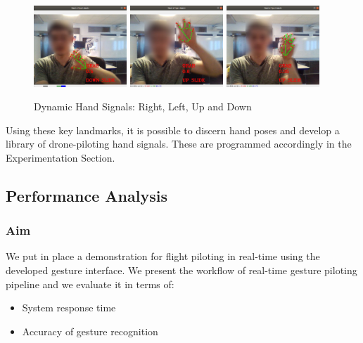 \begin{figure}[h]
    \raggedright
    \includegraphics[width=3.5cm]{images/hand_drone_interaction/grab_down_censored.jpg} %
    \includegraphics[width=3.5cm]{images/hand_drone_interaction/grab_up_fast_censored.jpg}
    \includegraphics[width=3.5cm]{images/hand_drone_interaction/grab_up_slow_censored.jpg}
    \caption{Dynamic Hand Signals: Right, Left, Up and Down}
\end{figure}

Using these key landmarks, it is possible to discern hand poses and develop a library of drone-piloting hand signals. These are programmed accordingly in the Experimentation Section.

\pagebreak
\subsection{Performance Analysis}



\subsubsection{Aim}

We put in place a demonstration for flight piloting in real-time using the developed gesture interface. 
We present the workflow of real-time gesture piloting pipeline and we evaluate it in terms of:
\begin{itemize}
    \item System response time
    \item Accuracy of gesture recognition
\end{itemize}

